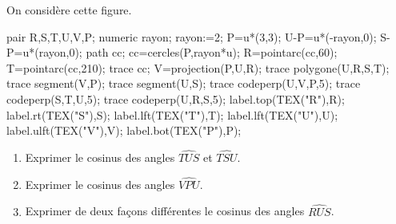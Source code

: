 \begin{exercice*}
    On considère cette figure.

    \begin{minipage}{0.5\linewidth}
        \begin{center}
            \begin{Geometrie}
                pair R,S,T,U,V,P;
                numeric rayon;
                rayon:=2;
                P=u*(3,3);
                U-P=u*(-rayon,0);
                S-P=u*(rayon,0);
                path cc;
                cc=cercles(P,rayon*u);
                R=pointarc(cc,60);
                T=pointarc(cc,210);
                trace cc;
                V=projection(P,U,R);
                trace polygone(U,R,S,T);
                trace segment(V,P);
                trace segment(U,S);
                trace codeperp(U,V,P,5);
                trace codeperp(S,T,U,5);
                trace codeperp(U,R,S,5);
                label.top(TEX("R"),R);
                label.rt(TEX("S"),S);
                label.lft(TEX("T"),T);
                label.lft(TEX("U"),U);
                label.ulft(TEX("V"),V);
                label.bot(TEX("P"),P);
            \end{Geometrie}
        \end{center}
    \end{minipage}
    \begin{minipage}{0.45\linewidth}
        \begin{enumerate}
            \item Exprimer le cosinus des angles $\widehat{TUS}$ et $\widehat{TSU}$.
            \item Exprimer le cosinus des angles $\widehat{VPU}$.
            \item Exprimer de deux façons différentes le cosinus des angles $\widehat{RUS}$.
        \end{enumerate}
    \end{minipage}
\end{exercice*}
